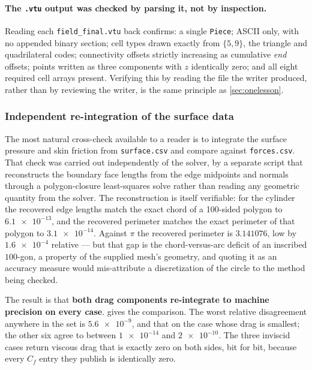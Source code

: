 \paragraph{The \texttt{.vtu} output was checked by parsing it, not by inspection.} Reading
each \texttt{field\_final.vtu} back confirms: a single \texttt{Piece}; ASCII only, with no
appended binary section; cell types drawn exactly from $\{5,9\}$, the triangle and
quadrilateral codes; connectivity offsets strictly increasing as cumulative \emph{end}
offsets; points written as three components with $z$ identically zero; and all eight required
cell arrays present. Verifying this by reading the file the writer produced, rather than by
reviewing the writer, is the same principle as \cref{sec:onelesson}.

\subsubsection{Independent re-integration of the surface data}
\label{sec:reintegrate}

The most natural cross-check available to a reader is to integrate the surface
pressure and skin friction from \texttt{surface.csv} and compare against
\texttt{forces.csv}. That check was carried out independently of the solver, by a
separate script that reconstructs the boundary face lengths from the edge midpoints
and normals through a polygon-closure least-squares solve rather than reading any
geometric quantity from the solver. The reconstruction is itself verifiable: for the
cylinder the recovered edge lengths match the exact chord of a 100-sided polygon to
$\num{6.1e-13}$, and the recovered perimeter matches the exact perimeter of that polygon
to $\num{3.1e-14}$. Against $\pi$ the recovered perimeter is $3.141076$, low by
$\num{1.6e-4}$ relative --- but that gap is the chord-versus-arc deficit of an inscribed
$100$-gon, a property of the supplied mesh's geometry, and quoting it as an accuracy
measure would mis-attribute a discretization of the circle to the method being checked.

The result is that \textbf{both drag components re-integrate to machine precision on
every case}.  gives the comparison. The worst relative
disagreement anywhere in the set is $\num{5.6e-9}$, and that on the case whose drag is
smallest; the other six agree to between $\num{1e-14}$ and $\num{2e-10}$. The three
inviscid cases return viscous drag that is exactly zero on both sides, bit for bit,
because every $C_f$ entry they publish is identically zero.

